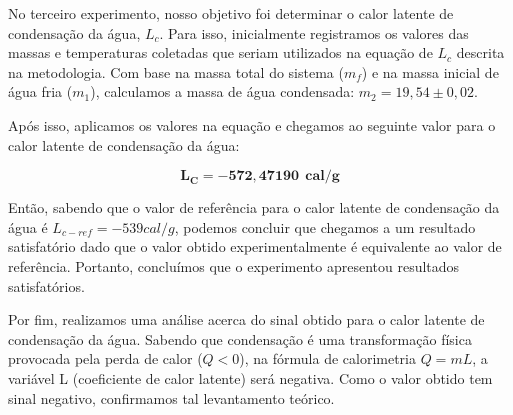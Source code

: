 No terceiro experimento, nosso objetivo foi determinar o calor latente de condensação da água, $L_c$. Para isso, inicialmente registramos os valores das massas e temperaturas coletadas que seriam utilizados na equação de $L_c$ descrita na metodologia. Com base na massa total do sistema ($m_f$) e na massa inicial de água fria ($m_1$), calculamos a massa de água condensada: $m_2 = 19,54 \pm 0,02$.

Após isso, aplicamos os valores na equação e chegamos ao seguinte valor para o calor latente de condensação da água:

\[ \mathbf{L_C = -572,47190 \ \  cal/g}\]

Então, sabendo que o valor de referência para o calor latente de condensação da água é $L_{c-ref}= -539 cal/g$, podemos concluir que chegamos a um resultado satisfatório dado que o valor obtido experimentalmente é equivalente ao valor de referência. Portanto, concluímos que o experimento apresentou resultados satisfatórios.

Por fim, realizamos uma análise acerca do sinal obtido para o calor latente de condensação da água. Sabendo que  condensação é uma transformação física provocada pela perda de calor ($Q < 0$), na fórmula de calorimetria $Q = mL$, a variável L (coeficiente de calor latente) será negativa. Como o valor obtido tem sinal negativo, confirmamos tal levantamento teórico.
